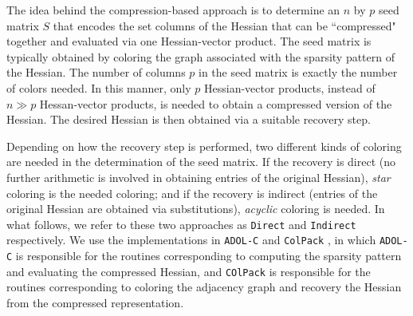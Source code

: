 \documentclass[final,leqno,onefignum,onetabnum]{siamart}
\begin{document}
The idea behind the compression-based approach is to determine an $n$ by $p$ seed matrix $S$
that encodes the set columns of the Hessian that can be ``compressed" together and evaluated via one Hessian-vector product. The seed matrix is typically obtained by
coloring the graph associated with the sparsity pattern of the Hessian. 
The number of columns $p$ in the seed matrix is exactly the number of colors needed. 
In this manner, only $p$ Hessian-vector products, instead of $n \gg p$ Hessan-vector products, is needed to obtain a compressed version of the Hessian. The desired Hessian is then obtained via a suitable recovery step.  

Depending on how the recovery step is performed, two different kinds of coloring are needed in the determination of the seed matrix. If the recovery is direct (no further arithmetic is involved in obtaining entries of the original Hessian),  {\em star} coloring is the needed coloring;
and if the recovery is indirect (entries of the original Hessian are obtained via substitutions), {\em acyclic} coloring is needed. In what follows, we refer to these two approaches  as {\tt Direct} and {\tt Indirect} respectively. We use the implementations in {\tt ADOL-C} \cite{walther2009getting} and {\tt ColPack} \cite{gebremedhin2013colpack}, in which {\tt ADOL-C} is responsible for the routines corresponding to computing the sparsity pattern and evaluating the compressed Hessian, and {\tt COlPack} is responsible for the routines  corresponding to coloring the adjacency graph and recovery the Hessian from the compressed representation.
\end{document}
